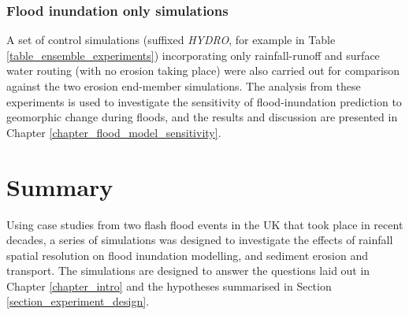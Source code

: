 \subsubsection{Flood inundation only simulations}
A set of control simulations (suffixed \textit{HYDRO}, for example in Table \ref{table_ensemble_experiments}) incorporating only rainfall-runoff and surface water routing (with no erosion taking place) were also carried out for comparison against the two erosion end-member simulations. The analysis from these experiments is used to investigate the sensitivity of flood-inundation prediction to geomorphic change during floods, and the results and discussion are presented in Chapter \ref{chapter_flood_model_sensitivity}.




%

\section{Summary}

Using case studies from two flash flood events in the UK that took place in recent decades, a series of simulations was designed to investigate the effects of rainfall spatial resolution on flood inundation modelling, and sediment erosion and transport. The simulations are designed to answer the questions laid out in Chapter \ref{chapter_intro} and the hypotheses summarised in Section \ref{section_experiment_design}. 

